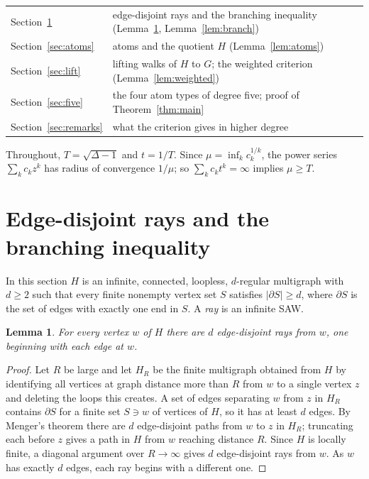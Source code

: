\documentclass[11pt]{amsart}
\newtheorem{lemma}[theorem]{Lemma}
\theoremstyle{remark}
\newcommand{\pd}{\partial}
\begin{document}
\begin{center}
\begin{tabular}{ll}
Section~\ref{sec:branch} & edge-disjoint rays and the branching inequality (Lemma~\ref{lem:rays}, Lemma~\ref{lem:branch})\\
Section~\ref{sec:atoms} & atoms and the quotient $H$ (Lemma~\ref{lem:atoms})\\
Section~\ref{sec:lift} & lifting walks of $H$ to $G$; the weighted criterion (Lemma~\ref{lem:weighted})\\
Section~\ref{sec:five} & the four atom types of degree five; proof of Theorem~\ref{thm:main}\\
Section~\ref{sec:remarks} & what the criterion gives in higher degree
\end{tabular}
\end{center}

Throughout, $T=\sqrt{\Delta-1}$ and $t=1/T$. Since $\mu=\inf_kc_k^{1/k}$, the power series $\sum_kc_kz^k$ has radius
of convergence $1/\mu$; so $\sum_kc_kt^k=\infty$ implies $\mu\ge T$.

\section{Edge-disjoint rays and the branching inequality}\label{sec:branch}

In this section $H$ is an infinite, connected, loopless, $d$-regular multigraph with $d\ge2$ such that every finite
nonempty vertex set $S$ satisfies $|\pd S|\ge d$, where $\pd S$ is the set of edges with exactly one end in $S$. A
\emph{ray} is an infinite SAW.

\begin{lemma}\label{lem:rays}
For every vertex $w$ of $H$ there are $d$ edge-disjoint rays from $w$, one beginning with each edge at $w$.
\end{lemma}

\begin{proof}
Let $R$ be large and let $H_R$ be the finite multigraph obtained from $H$ by identifying all vertices at graph
distance more than $R$ from $w$ to a single vertex $z$ and deleting the loops this creates. A set of edges separating
$w$ from $z$ in $H_R$ contains $\pd S$ for a finite set $S\ni w$ of vertices of $H$, so it has at least $d$ edges. By
Menger's theorem there are $d$ edge-disjoint paths from $w$ to $z$ in $H_R$; truncating each before $z$ gives a path in $H$
from $w$ reaching distance $R$. Since $H$ is locally finite, a diagonal argument over $R\to\infty$ gives $d$ edge-disjoint rays from
$w$. As $w$ has exactly $d$ edges, each ray begins with a different one.
\end{proof}
\end{document}
